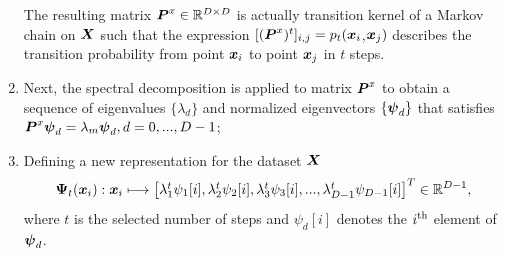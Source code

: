 \begin{enumerate}
{		 The resulting matrix $ {\mbox{\boldmath $P$}}^x \in \mathbb{R}^{D
			\times D} $ is actually transition kernel of a 
		Markov chain on ${\mbox{\boldmath $X$}}$ such that the expression
		${[{({\mbox{\boldmath $P$}}^x)^t}]_{i,j}}=p_t({\mbox{\boldmath $x$}}_i$,${\mbox{\boldmath $x$}}_j)$
		describes the transition probability from point
		\begin{math}{{\mbox{\boldmath $x$}}_i}
		\end{math} to point \begin{math}{{\mbox{\boldmath $x$}}_j}
		\end{math} in $t$ steps.
	}
\item{ Next, the spectral decomposition is applied to matrix \begin{math}  {\mbox{\boldmath $P$}}^x \end{math} to obtain a sequence of eigenvalues  \begin{math}{\lbrace {\lambda_d}\rbrace }
		\end{math} and normalized eigenvectors \begin{math}{\lbrace{{\mbox{\boldmath${\psi}$}}_d}\rbrace }
		\end{math} that satisfies ${ {{\mbox{\boldmath $P$}}^x}  {\mbox{\boldmath${\psi}$}_d} =\lambda_m{\mbox{\boldmath${\psi}$}}_d, d=0,...,D-1}
		$; }
\item{
		Defining a new representation for the dataset ${\mbox{\boldmath $X$}}$
		\begin{equation}{ {\mbox{\boldmath $\Psi$}}_t{({\mbox{\boldmath $x$}}_i)}:   {\mbox{\boldmath $x$}}_i
			\longmapsto \begin{bmatrix} { \lambda_1^{t}\psi_1[i]} , {
				\lambda_2^{t}\psi_2[i]} , { \lambda_3^{t}\psi_3[i]} , {.} {.} {.}
			,
			
			{\lambda_{D-1}^{t}\psi_{D-1}[i]}\\
			
			\end{bmatrix}^T \in{\mathbb{R}^{D-1}} },
		\end{equation}
		where $t$ is the selected number of steps and $\psi_d[i]$ denotes the $i^{\rm{th}}$ element of ${\mbox{\boldmath${\psi}$}_d}$.
		
}
\end{enumerate}
